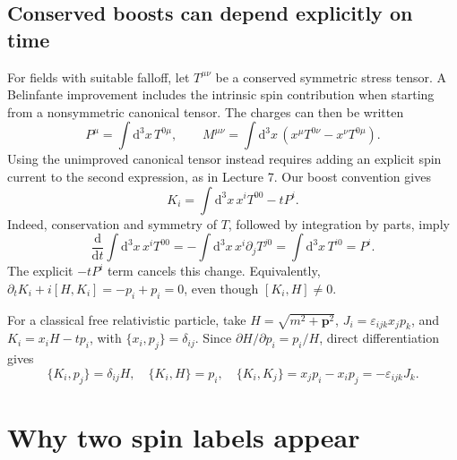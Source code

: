 \documentclass[11pt]{article}
\newcommand{\dd}{\mathrm{d}}
\newcommand{\eps}{\varepsilon}
\begin{document}
\subsection{Conserved boosts can depend explicitly on time}
For fields with suitable falloff, let \(T^{\mu\nu}\) be a conserved
symmetric stress tensor. A Belinfante improvement includes the intrinsic
spin contribution when starting from a nonsymmetric canonical tensor.
The charges can then be written
\begin{equation}
 P^\mu=\int\dd^3x\,T^{0\mu},\qquad
 M^{\mu\nu}=\int\dd^3x\,(x^\mu T^{0\nu}-x^\nu T^{0\mu}).
 \label{eq:stress-charges}
\end{equation}
Using the unimproved canonical tensor instead requires adding an
explicit spin current to the second expression, as in Lecture 7.
Our boost convention gives
\begin{equation}
 K_i=\int\dd^3x\,x^iT^{00}-tP^i.
 \label{eq:boost-charge}
\end{equation}
Indeed, conservation and symmetry of \(T\), followed by integration by
parts, imply
\[
 \frac{\dd}{\dd t}\int\dd^3x\,x^iT^{00}
 =-\int\dd^3x\,x^i\partial_jT^{j0}
 =\int\dd^3x\,T^{i0}=P^i.
\]
The explicit \(-tP^i\) term cancels this change. Equivalently,
\(\partial_tK_i+i[H,K_i]=-p_i+p_i=0\), even though
\([K_i,H]\ne0\).

\begin{remarkbox}
For a classical free relativistic particle, take
\(H=\sqrt{m^2+\bm p^2}\), \(J_i=\eps_{ijk}x_jp_k\), and
\(K_i=x_iH-tp_i\), with \(\{x_i,p_j\}=\delta_{ij}\).
Since \(\partial H/\partial p_i=p_i/H\), direct differentiation gives
\[
 \{K_i,p_j\}=\delta_{ij}H,\quad
 \{K_i,H\}=p_i,\quad
 \{K_i,K_j\}=x_jp_i-x_ip_j=-\eps_{ijk}J_k.
\]
\end{remarkbox}

\section{Why two spin labels appear}
\end{document}
